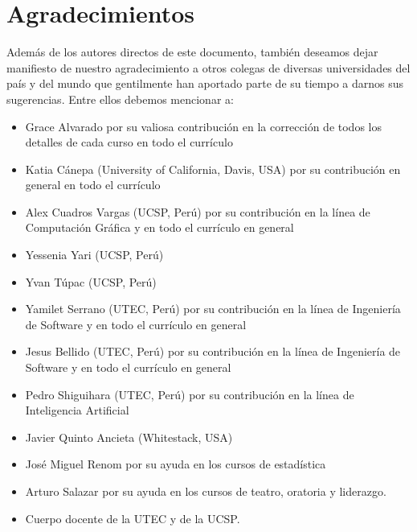 \chapter*{Agradecimientos}\label{chap:cs-ack}
%

Además de los autores directos de este documento, también deseamos dejar manifiesto de nuestro 
agradecimiento a otros colegas de diversas universidades del país y del mundo que gentilmente 
han aportado parte de su tiempo a darnos sus sugerencias. Entre ellos debemos mencionar a:

\begin{itemize}
\item Grace Alvarado por su valiosa contribución en la corrección de todos los detalles de cada curso en todo el currículo
\item Katia Cánepa (University of California, Davis, USA) por su contribución en general en todo el currículo
\item Alex Cuadros Vargas (UCSP, Perú) por su contribución en la línea de Computación Gráfica y en todo el currículo en general
\item Yessenia Yari (UCSP, Perú)
\item Yvan Túpac (UCSP, Perú)
\item Yamilet Serrano (UTEC, Perú) por su contribución en la línea de Ingeniería de Software y en todo el currículo en general
\item Jesus Bellido (UTEC, Perú) por su contribución en la línea de Ingeniería de Software y en todo el currículo en general
\item Pedro Shiguihara (UTEC, Perú) por su contribución en la línea de Inteligencia Artificial 
\item Javier Quinto Ancieta (Whitestack, USA)
\item José Miguel Renom por su ayuda en los cursos de estadística
\item Arturo Salazar por su ayuda en los cursos de teatro, oratoria y liderazgo.
\item Cuerpo docente de la UTEC y de la UCSP.
\end{itemize}

